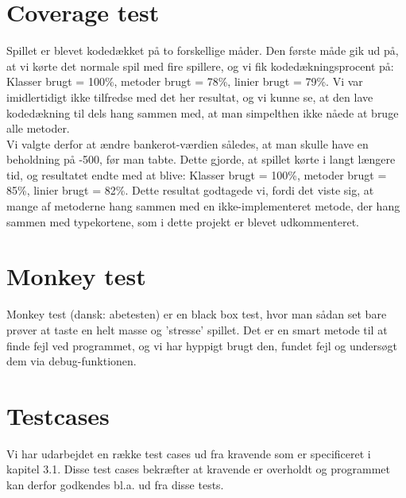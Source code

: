 \section{Coverage test}
Spillet er blevet kodedækket på to forskellige måder.
Den første måde gik ud på, at vi kørte det normale spil med fire spillere, og vi fik kodedækningsprocent på: Klasser brugt = 100\%, metoder brugt = 78\%, linier brugt = 79\%.
Vi var imidlertidigt ikke tilfredse med det her resultat, og vi kunne se, at den lave kodedækning til dels hang sammen med, at man simpelthen ikke nåede at bruge alle metoder.
\\ Vi valgte derfor at ændre bankerot-værdien således, at man skulle have en beholdning på -500, før man tabte. Dette gjorde, at spillet kørte i langt længere tid, og resultatet endte med at blive: Klasser brugt = 100\%, metoder brugt = 85\%, linier brugt = 82\%.
Dette resultat godtagede vi, fordi det viste sig, at mange af metoderne hang sammen med en ikke-implementeret metode, der hang sammen med typekortene, som i dette projekt er blevet udkommenteret.

\section{Monkey test}
Monkey test (dansk: abetesten) er en black box test, hvor man sådan set bare prøver at taste en helt masse og 'stresse' spillet.
Det er en smart metode til at finde fejl ved programmet, og vi har hyppigt brugt den, fundet fejl og undersøgt dem via debug-funktionen.

\section{Testcases}
Vi har udarbejdet en række test cases ud fra kravende som er specificeret i kapitel 3.1.
Disse test cases bekræfter at kravende er overholdt og programmet kan derfor godkendes bl.a. ud fra disse tests.

